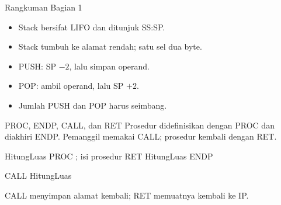 \documentclass[aspectratio=169,11pt]{beamer}
\begin{document}
\begin{frame}{Rangkuman Bagian 1}
\small
\begin{itemize}
    \item Stack bersifat LIFO dan ditunjuk SS:SP.

    \vspace{0.15em}
    \item Stack tumbuh ke alamat rendah; satu sel dua byte.

    \vspace{0.15em}
    \item PUSH: SP $-2$, lalu simpan operand.

    \vspace{0.15em}
    \item POP: ambil operand, lalu SP $+2$.

    \vspace{0.15em}
    \item Jumlah PUSH dan POP harus seimbang.
\end{itemize}
\end{frame}


\begin{frame}[fragile]{PROC, ENDP, CALL, dan RET}
\small
Prosedur didefinisikan dengan PROC dan diakhiri ENDP. Pemanggil
memakai CALL; prosedur kembali dengan RET.

\vspace{0.2em}
\begin{kodeasm}[numbers=none]
HitungLuas PROC
    ; isi prosedur
    RET
HitungLuas ENDP

CALL HitungLuas
\end{kodeasm}

\vspace{0.1em}
{\footnotesize\color{obeGray}CALL menyimpan alamat kembali; RET
memuatnya kembali ke IP.\par}
\end{frame}
\end{document}

